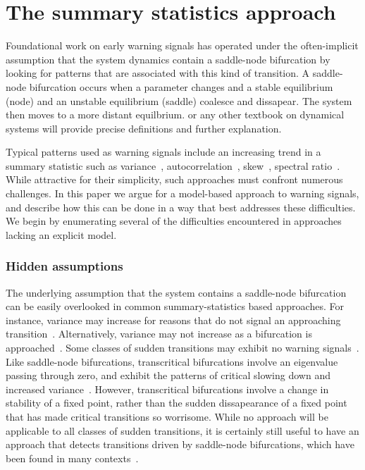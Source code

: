 \documentclass[authoryear,review,11pt]{elsarticle}
\begin{document}
\section{The summary statistics approach}
Foundational work on early warning signals has operated under the often-implicit assumption
that the system dynamics contain a saddle-node bifurcation by
looking for patterns that are associated with this kind of transition.
A saddle-node bifurcation occurs when a parameter changes and a stable equilibrium 
(node) and an unstable equilibrium (saddle) coalesce and dissapear.  The system
then moves to a more distant equilbrium.  \citet{Guckenheimer1983} or any other 
textbook on dynamical systems will provide precise definitions and further explanation.   

Typical patterns used as warning signals include an increasing trend in a summary statistic such as
variance~\citep{Carpenter2006}, autocorrelation~\citep{Held2004, Dakos2008},
skew~\citep{Guttal2008}, spectral ratio~\citep{Biggs2009}.
While attractive for their simplicity, such approaches must confront numerous challenges.
In this paper we argue for a model-based approach to warning signals,
and describe how this can be done in a way that best addresses these difficulties.
We begin by enumerating several of the difficulties encountered in approaches lacking an explicit model.



\subsubsection*{Hidden assumptions}
The underlying assumption that the system contains a saddle-node bifurcation
can be easily overlooked in common summary-statistics based approaches.
For instance, variance may increase for reasons that
do not signal an approaching transition~\citep{Schreiber2003, Schreiber2008}.
Alternatively, variance may not increase as a bifurcation is approached~\citep{Livina2012, Dakos2011a}.
Some classes of sudden transitions may exhibit no warning signals~\cite{Hastings2010}.
Like saddle-node bifurcations, transcritical bifurcations involve an eigenvalue passing through zero,
and exhibit the patterns of critical slowing down and increased variance~\citep{Drake2010}.  
However, transcritical bifurcations involve a change in stability of a fixed point, rather
than the sudden dissapearance of a fixed point that has made critical transitions so worrisome.%
While no approach will be applicable to all classes of sudden transitions,
it is certainly still useful to have an approach that detects transitions driven by
saddle-node bifurcations, which have been found in many contexts~\citep[\emph{e.g.}, see][]{Scheffer2001}.
\end{document}
